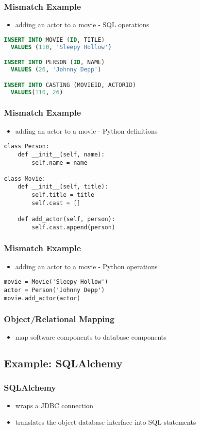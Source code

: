 \documentclass[dvipsnames]{beamer}
\theoremstyle{plain}
\begin{document}
\begin{frame}[fragile]
  \frametitle{Mismatch Example}

  \begin{itemize}
    \item adding an actor to a movie - SQL operations
  \end{itemize}

  \begin{lstlisting}[language=SQL]
INSERT INTO MOVIE (ID, TITLE)
  VALUES (110, 'Sleepy Hollow')

INSERT INTO PERSON (ID, NAME)
  VALUES (26, 'Johnny Depp')

INSERT INTO CASTING (MOVIEID, ACTORID)
  VALUES(110, 26)
  \end{lstlisting}
\end{frame}

\begin{frame}[fragile]
  \frametitle{Mismatch Example}

  \begin{itemize}
    \item adding an actor to a movie - Python definitions
  \end{itemize}

  \begin{lstlisting}
class Person:
    def __init__(self, name):
        self.name = name

class Movie:
    def __init__(self, title):
        self.title = title
        self.cast = []

    def add_actor(self, person):
        self.cast.append(person)
  \end{lstlisting}
\end{frame}

\begin{frame}[fragile]
  \frametitle{Mismatch Example}

  \begin{itemize}
    \item adding an actor to a movie - Python operations
  \end{itemize}

  \begin{lstlisting}
movie = Movie('Sleepy Hollow')
actor = Person('Johnny Depp')
movie.add_actor(actor)
  \end{lstlisting}
\end{frame}

\begin{frame}
  \frametitle{Object/Relational Mapping}

  \begin{itemize}
    \item map software components to database components
  \end{itemize}
\end{frame}

\subsection{Example: SQLAlchemy}

\begin{frame}
  \frametitle{SQLAlchemy}

  \begin{itemize}
    \item wraps a JDBC connection
    \item translates the object database interface into SQL statements
  \end{itemize}
\end{frame}
\end{document}
